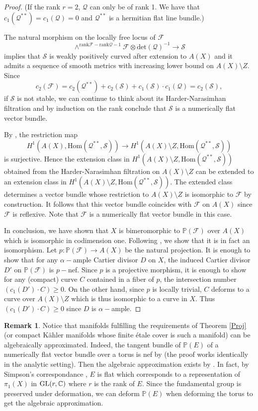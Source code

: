 \documentclass[a4, 12pt]{amsart}
\numberwithin{equation}{section}
\theoremstyle{definition}
\newtheorem{rem}[thm]{Remark}
\def\P{\mathbb{P}}
\def\cF{\mathcal{F}}
\def\P{\mathbb{P}}
\def \det{\mathrm{det}}
\def \rank{\mathrm{rank}}
\def \hom{\mathrm{Hom}}
\def\cS{\mathcal{S}}
\def\cQ{\mathcal{Q}}
\begin{document}
\begin{proof}
(If the rank $r=2$, $\cQ$ can only be of rank 1.
We have that $c_1(\cQ^{**})=c_1(\cQ)=0$ and $\cQ^{**}$ is a hermitian flat line bundle.)

The natural morphism on the locally free locus of $\cF$
$$\wedge^{\rank{\cF}-\rank{\cQ}-1} \cF \otimes \det(\cQ)^{-1} \to \cS$$
implies that $\cS$ is weakly positively curved after extension to $A(X)$ and it admits a sequence of smooth metrics with increasing lower bound on $A(X) \setminus Z$.
Since
$$c_2(\cF)=c_2(\cQ^{**})+c_2(\cS)+c_1(\cS) \cdot c_1(\cQ)=c_2(\cS),$$
if $\cS$ is not stable, we can continue to think about its Harder-Narasimhan filtration and by induction on the rank conclude that $\cS$ is a numerically flat vector bundle.

By \cite[Lemma 4]{numer_flat}, the restriction map
$$H^1(A(X), \hom(\cQ^{**}, \cS)) \to H^1(A(X) \setminus Z, \hom(\cQ^{**}, \cS))$$
is surjective.
Hence the extension class in $H^1(A(X) \setminus Z, \hom(\cQ^{**}, \cS))$ obtained from the Harder-Narasimhan filtration on $A(X) \setminus Z$ can be extended to an
extension class in $H^1(A(X) \setminus Z, \hom(\cQ^{**}, \cS))$. The extended class determines a vector bundle
whose restriction to $A(X) \setminus Z$ is isomorphic to $\cF$ by construction. It follows that this vector
bundle coincides with $\cF$ on $A(X)$ since $\cF$ is reflexive.
Note that $\cF$ is a numerically flat vector bundle in this case.

In conclusion, we have shown that $X$ is bimeromorphic to $\P(\cF)$ over $A(X)$ which is isomorphic in codimension one.
Following \cite[Lemma 6.39]{KM98}, we show that it is in fact an isomorphism.
Let $p: \P(\cF) \to A(X)$ be the natural projection.
It is enough to show that for any $\alpha-$ample Cartier divisor $D$ on $X$, the induced Cartier divisor $D'$ on $\P(\cF)$ is $p-$nef.
Since $p$ is a projective morphism, it is enough to show for any (compact) curve $C$ contained in a fiber of $p$, the intersection number $(c_1(D') \cdot C) \geq 0$.
On the other hand, since $p$ is locally trivial, $C$ deforms to a curve over $A(X) \setminus Z$ which is thus isomorphic to a curve in $X$.
Thus $(c_1(D') \cdot C) \geq 0$ since $D$ is $\alpha-$ample.
\end{proof}
\begin{rem}
Notice that manifolds fulfilling the requirements of Theorem \ref{Proj} (or compact K\"ahler manifolds whose finite \'etale cover is such a manifold) can be algebraically approximated.
Indeed, the tangent bundle of $\P(E)$ of a numerically flat vector bundle over a torus is nef by \cite[Lemma 7.4]{CP91} (the proof works identically in the analytic setting).
Then the algebraic approximation exists by \cite[Theorem 6.3]{Cao15}.
In fact, by Simpson's correspondance \cite{Sim92}, $E$ is flat which corresponds to a representation of $\pi_1(X)$ in 
$\mathrm{GL}(r,\mathbb{C})$ where $r$ is the rank of $E$.
Since the fundamental group is preserved under deformation, we can deform $\P(E)$ when deforming the torus to get the algebraic approximation.
\end{rem}
\end{document}
